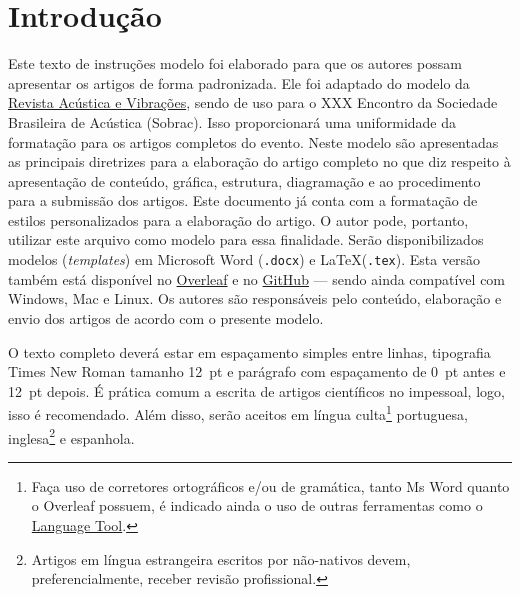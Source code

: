 \documentclass[12pt, a4paper, twoside, onecolumn]{article}
\begin{document}
 \setcounter{page}{1}   %
\clearpage %

\section{Introdução}

Este texto de instruções modelo foi elaborado para que os autores possam apresentar os artigos de forma padronizada. 
Ele foi adaptado do modelo da \href{https://revista.acustica.org.br}{Revista Acústica e Vibrações}, sendo de uso para o XXX Encontro da Sociedade Brasileira de Acústica (Sobrac).
%
Isso proporcionará uma uniformidade da formatação para os artigos completos do evento.
Neste modelo são apresentadas as principais diretrizes para a elaboração do artigo completo no que diz respeito à apresentação de conteúdo, gráfica, estrutura, diagramação e ao procedimento para a submissão dos artigos. 
Este documento já conta com a formatação de estilos personalizados para a elaboração do artigo. O autor pode, portanto, utilizar este arquivo como modelo para essa finalidade. Serão disponibilizados modelos (\textit{templates}) em Microsoft Word (\texttt{.docx}) e \LaTeX\xspace (\texttt{.tex}). Esta versão também está disponível no \href{https://www.overleaf.com/read/xnhkrtjwprcn}{Overleaf} e no \href{https://github.com/willdfonseca/latex}{GitHub} --- sendo ainda compatível com Windows, Mac e Linux. 
Os autores são responsáveis pelo conteúdo, elaboração e envio dos artigos de acordo com o presente modelo.

O texto completo deverá estar em espaçamento simples entre linhas, tipografia Times New Roman tamanho 12~pt e parágrafo com espaçamento de 0~pt antes e 12~pt depois. É prática comum a escrita de artigos científicos no impessoal, logo,  isso é recomendado. Além disso, serão aceitos em língua culta\footnote{Faça uso de corretores ortográficos e/ou de gramática, tanto Ms Word quanto o Overleaf possuem, é indicado ainda o uso de outras ferramentas como o \href{https://languagetool.org/pt-BR}{Language Tool}.} portuguesa, inglesa\footnote{Artigos em língua estrangeira escritos por não-nativos devem, preferencialmente, receber revisão profissional.} e espanhola\footnotemark[2]. 
\end{document}

